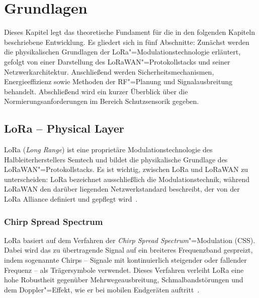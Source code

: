 
\chapter{Grundlagen}
\label{chap:grundlagen}

Dieses Kapitel legt das theoretische Fundament für die in den folgenden Kapiteln
beschriebene Entwicklung. Es gliedert sich in fünf Abschnitte: Zunächst werden die
physikalischen Grundlagen der LoRa"=Modulationstechnologie erläutert, gefolgt von
einer Darstellung des LoRaWAN"=Protokollstacks und seiner Netzwerkarchitektur.
Anschließend werden Sicherheitsmechanismen, Energieeffizienz sowie Methoden der
RF"=Planung und Signalausbreitung behandelt. Abschließend wird ein kurzer Überblick
über die Normierungsanforderungen im Bereich Schutzsensorik gegeben.


\section{LoRa -- Physical Layer}
\label{sec:lora-physical}

LoRa (\textit{Long Range}) ist eine proprietäre Modulationstechnologie des Halbleiterherstellers
Semtech und bildet die physikalische Grundlage des LoRaWAN"=Protokollstacks. Es ist wichtig,
zwischen LoRa und LoRaWAN zu unterscheiden: LoRa bezeichnet ausschließlich die
Modulationstechnik, während LoRaWAN den darüber liegenden Netzwerkstandard beschreibt,
der von der LoRa Alliance definiert und gepflegt wird~\cite{semtech_lora_basics}.

\subsection{Chirp Spread Spectrum}
\label{subsec:css}

LoRa basiert auf dem Verfahren der \textit{Chirp Spread Spectrum}"=Modulation (CSS).
Dabei wird das zu übertragende Signal auf ein breiteres Frequenzband gespreizt, indem
sogenannte Chirps -- Signale mit kontinuierlich steigender oder fallender Frequenz --
als Trägersymbole verwendet. Dieses Verfahren verleiht LoRa eine hohe Robustheit
gegenüber Mehrwegeausbreitung, Schmalbandstörungen und dem Doppler"=Effekt, wie er
bei mobilen Endgeräten auftritt~\cite{augustin2016study}.

